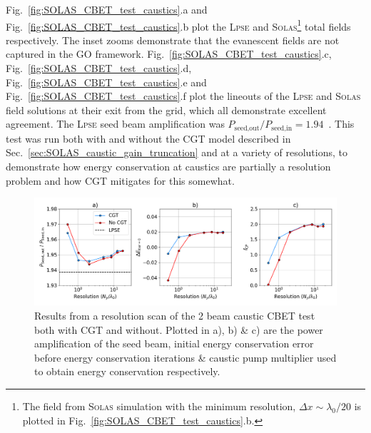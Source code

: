 Fig.~\ref{fig:SOLAS_CBET_test_caustics}.a and Fig.~\ref{fig:SOLAS_CBET_test_caustics}.b plot the \textsc{Lpse} and \textsc{Solas}\footnote{The field from \textsc{Solas} simulation with the minimum resolution, $\Delta x \sim \lambda_0/20$ is plotted in Fig.~\ref{fig:SOLAS_CBET_test_caustics}.b.} total fields respectively.
The inset zooms demonstrate that the evanescent fields are not captured in the \ac{GO} framework.
Fig.~\ref{fig:SOLAS_CBET_test_caustics}.c, Fig.~\ref{fig:SOLAS_CBET_test_caustics}.d, Fig.~\ref{fig:SOLAS_CBET_test_caustics}.e and Fig.~\ref{fig:SOLAS_CBET_test_caustics}.f plot the lineouts of the \textsc{Lpse} and \textsc{Solas} field solutions at their exit from the grid, which all demonstrate excellent agreement.
The \textsc{Lpse} seed beam amplification was $P_{\text{seed,out}}/P_{\text{seed,in}}=1.94$~\cite{follett_validation_2022}.
This test was run both with and without the \ac{CGT} model described in Sec.~\ref{sec:SOLAS_caustic_gain_truncation} and at a variety of resolutions, to demonstrate how energy conservation at caustics are partially a resolution problem and how \ac{CGT} mitigates for this somewhat.

\begin{figure}[t!]
    \includegraphics[width=1.0\linewidth]{Numerics/Images/caustic_cbet_test_resscan.png}
    \centering
    \caption{Results from a resolution scan of the 2 beam caustic \ac{CBET} test both with \ac{CGT} and without.
    Plotted in a), b) \& c) are the power amplification of the seed beam, initial energy conservation error before energy conservation iterations \& caustic pump multiplier used to obtain energy conservation respectively.}%
    \label{fig:SOLAS_CBET_test_caustics_resscan}
\end{figure}

